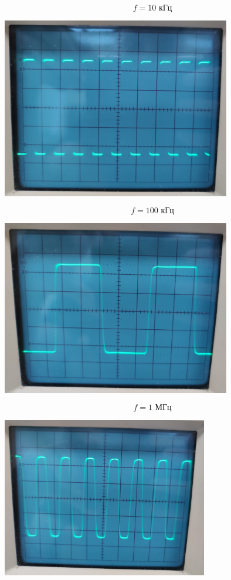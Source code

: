 \documentclass[a4paper, 12pt]{article} %
\begin{document}
\[f = 10 \text{ кГц}\]

\begin{center}
	\includegraphics[width=10cm]{5}
\end{center}

\[f = 100 \text{ кГц}\]

\begin{center}
	\includegraphics[width=10cm]{6}
\end{center}

\newpage
\[f = 1 \text{ МГц}\]
\begin{center}
	\includegraphics[width=9cm]{7}
\end{center}
\end{document}
